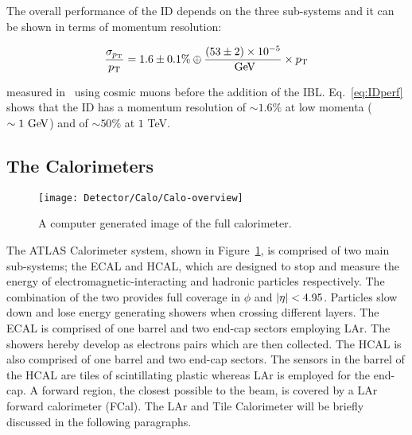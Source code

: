				The overall performance of the \ac{ID} depends on the three sub-systems and it can be shown in terms of momentum resolution: 

				\begin{equation}
				\label{eq:IDperf}
					\displaystyle \frac{\sigma_{\pt}}{\pt} = 1.6 \pm 0.1\% \oplus \frac{(53 \pm 2) \times 10^{-5}}{\GeV} \times \pt
				\end{equation}

				\noindent measured in~\cite{Aad2011} using cosmic muons before the addition of the \ac{IBL}. Eq.~\ref{eq:IDperf} shows that the \ac{ID} has a momentum resolution of $\sim 1.6\%$ at low momenta ($\sim 1 \GeV$) and of $\sim 50\%$ at $1$ TeV.

		\subsection{The Calorimeters}

			\begin{figure}[!htb]
				\centering
				\texttt{[image: Detector/Calo/Calo-overview]}
				\caption{A computer generated image of the full calorimeter.}
				\label{fig:Calo}
			\end{figure}

			The \ac{ATLAS} Calorimeter system, shown in Figure~\ref{fig:Calo}, is comprised of two main sub-systems; the \ac{ECAL} and \ac{HCAL}, which are designed to stop and measure the energy of electromagnetic-interacting and hadronic particles respectively. The combination of the two provides full coverage in $\phi$ and $|\eta| < 4.95$. Particles slow down and lose energy generating showers when crossing different layers. The \ac{ECAL} is comprised of one barrel and two end-cap sectors employing \ac{LAr}. The showers hereby develop as electrons pairs which are then collected. The \ac{HCAL} is also comprised of one barrel and two end-cap sectors. The sensors in the barrel of the \ac{HCAL} are tiles of scintillating plastic whereas \ac{LAr} is employed for the end-cap. A forward region, the closest possible to the beam, is covered by a \ac{LAr} forward calorimeter (FCal). The \ac{LAr} and Tile Calorimeter will be briefly discussed in the following paragraphs. 

